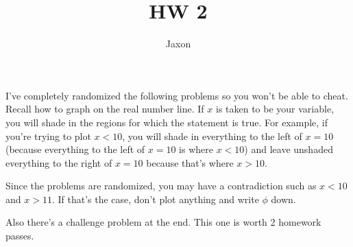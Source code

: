 \documentclass[12pt]{article}
\begin{document}
			\title{HW 2}
			\author{Jaxon}
			\date{}
			\maketitle
I've completely randomized the following problems so you won't be able to cheat. Recall how to 
graph on the real number line. If $x$ is taken
to be your variable, you will shade in the regions for which the statement is true. For example, if you're
trying to plot $x < 10$, you will shade in everything to the left of $x = 10$ (because everything to the 
left of $x = 10$ is where $x < 10$) and leave unshaded everything to the right of $x = 10$ because that's where
$x > 10$.

Since the problems are randomized, you may have a contradiction such as $x < 10$ and $x > 11$. If that's the case,
don't plot anything and write $\phi$ down.

Also there's a challenge problem at the end. This one is worth 2 homework passes.
\end{document}
